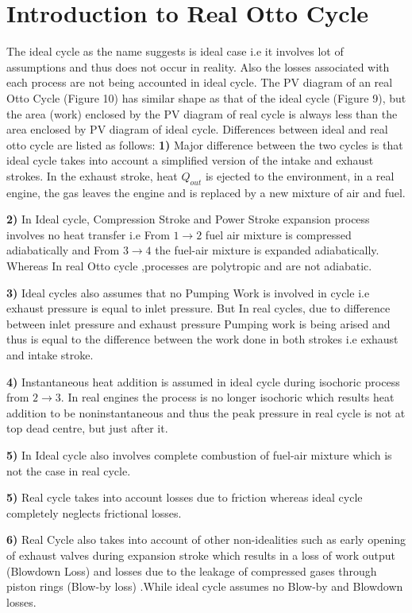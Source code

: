 \documentclass[11pt]{article}
\begin{document}
\section{Introduction to Real Otto Cycle}
 The ideal cycle as the name suggests is ideal case i.e it involves lot of assumptions and thus does not occur in reality. Also the losses associated with each process are not being accounted in ideal cycle. The PV diagram of an real Otto Cycle (Figure 10) has similar shape as that of the ideal cycle (Figure 9), but the area (work) enclosed by the PV diagram of real cycle is always less than the area enclosed by PV diagram of ideal cycle. 
\newline Differences between ideal and real otto cycle are listed as follows:\newline
\textbf{1) } Major difference between the two cycles is that ideal cycle takes into account a simplified version of the intake and exhaust strokes. In the exhaust stroke, heat $Q_{out}$ is ejected to the environment, in a real engine, the gas leaves the engine and is replaced by a new mixture of air and fuel.

\textbf{2) } In Ideal cycle, Compression Stroke and Power Stroke expansion process involves no heat transfer i.e From $ 1\rightarrow2$ fuel air mixture is compressed adiabatically and From $ 3\rightarrow4$ the fuel-air mixture is expanded adiabatically. Whereas In real Otto cycle ,processes are polytropic and are not adiabatic.

\textbf{3) } Ideal cycles also assumes that no Pumping Work is involved in cycle i.e exhaust pressure is equal to inlet pressure. But In real cycles, due to difference between inlet pressure and exhaust pressure Pumping work is being arised and thus is equal to the difference between the work done in both strokes i.e exhaust and intake stroke.

\textbf{4) }Instantaneous heat addition is assumed in ideal cycle  during isochoric process from $ 2\rightarrow3$. In real engines the process is no longer isochoric which results  heat addition to be noninstantaneous and thus the peak pressure in real cycle is not at top dead centre, but just after it.

\textbf{5) } In Ideal cycle also involves complete combustion of fuel-air mixture which is not the case in real cycle.

\textbf{5) } Real cycle  takes into account losses due to friction whereas ideal cycle completely neglects frictional losses. 

\textbf{6) } Real Cycle also takes into account of other non-idealities such as early opening of exhaust valves during expansion stroke which results in a loss of work output (Blowdown Loss) and  losses due to the leakage of compressed gases through piston rings (Blow-by loss) .While ideal cycle assumes no Blow-by and Blowdown losses. 
\end{document}
